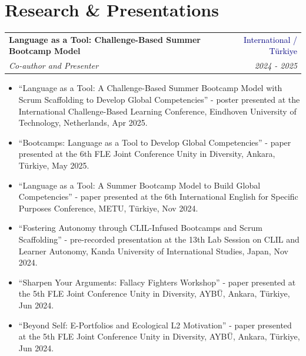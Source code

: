 \documentclass[10pt,letterpaper]{article}
\makeatletter
\newcommand{\entry}[4]{%
  \begin{tabularx}{\textwidth}{@{}Xr@{}}
    \textbf{#1} & \textcolor{navy}{#2}\\
    \textit{#3} & \textit{#4}
  \end{tabularx}\vspace{1pt}}
\makeatother
\begin{document}
  \section{Research \& Presentations}
  \entry{Language as a Tool: Challenge-Based Summer Bootcamp Model}{International / Türkiye}
        {Co-author and Presenter}{2024 - 2025}
  \begin{itemize}
    \item ``Language as a Tool: A Challenge-Based Summer Bootcamp Model with Scrum Scaffolding to Develop Global Competencies'' - poster presented at the International Challenge-Based Learning Conference, Eindhoven University of Technology, Netherlands, Apr 2025.
    \item ``Bootcamps: Language as a Tool to Develop Global Competencies'' - paper presented at the 6th FLE Joint Conference Unity in Diversity, Ankara, Türkiye, May 2025.
    \item ``Language as a Tool: A Summer Bootcamp Model to Build Global Competencies'' - paper presented at the 6th International English for Specific Purposes Conference, METU, Türkiye, Nov 2024.
    \item ``Fostering Autonomy through CLIL-Infused Bootcamps and Scrum Scaffolding'' - pre-recorded presentation at the 13th Lab Session on CLIL and Learner Autonomy, Kanda University of International Studies, Japan, Nov 2024.
    \item ``Sharpen Your Arguments: Fallacy Fighters Workshop'' - paper presented at the 5th FLE Joint Conference Unity in Diversity, AYBÜ, Ankara, Türkiye, Jun 2024.
    \item ``Beyond Self: E-Portfolios and Ecological L2 Motivation'' - paper presented at the 5th FLE Joint Conference Unity in Diversity, AYBÜ, Ankara, Türkiye, Jun 2024.
  \end{itemize}
\fi
\end{document}
